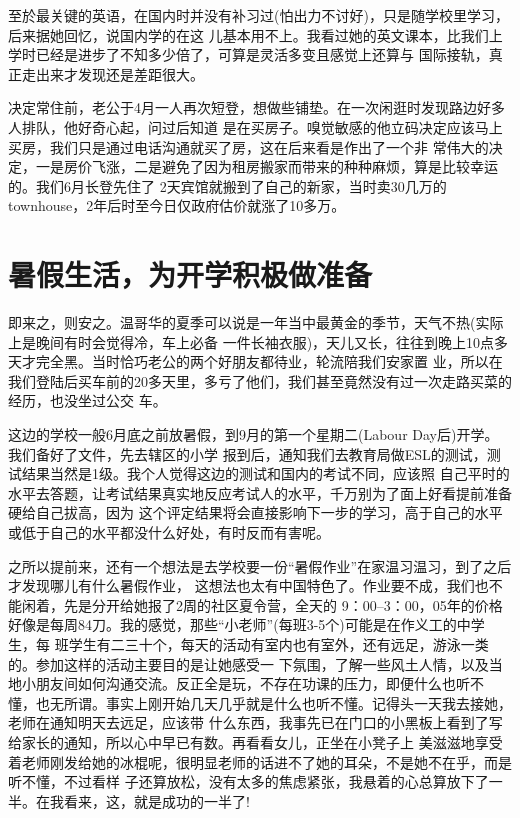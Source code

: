 \documentclass[11pt,a4paper,onecolumn]{article}
\begin{document}
至於最关键的英语，在国内时并没有补习过(怕出力不讨好)，只是随学校里学习，后来据她回忆，说国内学的在这
儿基本用不上。我看过她的英文课本，比我们上学时已经是进步了不知多少倍了，可算是灵活多变且感觉上还算与
国际接轨，真正走出来才发现还是差距很大。

决定常住前，老公于4月一人再次短登，想做些铺垫。在一次闲逛时发现路边好多人排队，他好奇心起，问过后知道
是在买房子。嗅觉敏感的他立码决定应该马上买房，我们只是通过电话沟通就买了房，这在后来看是作出了一个非
常伟大的决定，一是房价飞涨，二是避免了因为租房搬家而带来的种种麻烦，算是比较幸运的。我们6月长登先住了
2天宾馆就搬到了自己的新家，当时卖30几万的townhouse，2年后时至今日仅政府估价就涨了10多万。

\section{暑假生活，为开学积极做准备}

即来之，则安之。温哥华的夏季可以说是一年当中最黄金的季节，天气不热(实际上是晚间有时会觉得冷，车上必备
一件长袖衣服)，天儿又长，往往到晚上10点多天才完全黑。当时恰巧老公的两个好朋友都待业，轮流陪我们安家置
业，所以在我们登陆后买车前的20多天里，多亏了他们，我们甚至竟然没有过一次走路买菜的经历，也没坐过公交
车。

这边的学校一般6月底之前放暑假，到9月的第一个星期二(Labour Day后)开学。我们备好了文件，先去辖区的小学
报到后，通知我们去教育局做ESL的测试，测试结果当然是1级。我个人觉得这边的测试和国内的考试不同，应该照
自己平时的水平去答题，让考试结果真实地反应考试人的水平，千万别为了面上好看提前准备硬给自己拔高，因为
这个评定结果将会直接影响下一步的学习，高于自己的水平或低于自己的水平都没什么好处，有时反而有害呢。

之所以提前来，还有一个想法是去学校要一份``暑假作业''在家温习温习，到了之后才发现哪儿有什么暑假作业，
这想法也太有中国特色了。作业要不成，我们也不能闲着，先是分开给她报了2周的社区夏令营，全天的
9：00--3：00，05年的价格好像是每周84刀。我的感觉，那些``小老师''(每班3-5个)可能是在作义工的中学生，每
班学生有二三十个，每天的活动有室内也有室外，还有远足，游泳一类的。参加这样的活动主要目的是让她感受一
下氛围，了解一些风土人情，以及当地小朋友间如何沟通交流。反正全是玩，不存在功课的压力，即便什么也听不
懂，也无所谓。事实上刚开始几天几乎就是什么也听不懂。记得头一天我去接她，老师在通知明天去远足，应该带
什么东西，我事先已在门口的小黑板上看到了写给家长的通知，所以心中早已有数。再看看女儿，正坐在小凳子上
美滋滋地享受着老师刚发给她的冰棍呢，很明显老师的话进不了她的耳朵，不是她不在乎，而是听不懂，不过看样
子还算放松，没有太多的焦虑紧张，我悬着的心总算放下了一半。在我看来，这，就是成功的一半了!
\end{document}
